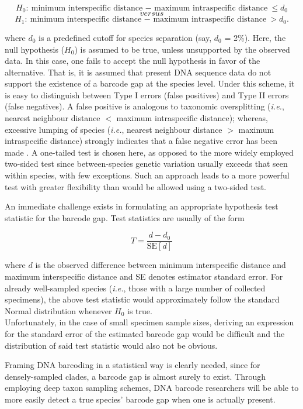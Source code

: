 $$H_0: \textrm{minimum interspecific distance $-$ maximum intraspecific distance} \leq d_0$$ $$\textit{versus}$$ $$H_1: \textrm{minimum interspecific distance $-$ maximum intraspecific distance} > d_0.$$

\noindent where $d_0$ is a predefined cutoff for species separation (say, $d_0$ = 2\%). Here, the null hypothesis ($H_0$) is assumed to be true, unless unsupported by the observed data. In this case, one fails to accept the null hypothesis in favor of the alternative. That is, it is assumed that present DNA sequence data do not support the existence of a barcode gap at the species level. Under this scheme, it is easy to distinguish between Type I errors (false positives) and Type II errors (false negatives). A false positive is analogous to taxonomic oversplitting (\textit{i.e.}, nearest neighbour distance $<$ maximum intraspecific distance); whereas, excessive lumping of species (\textit{i.e.}, nearest neighbour distance $>$ maximum intraspecific distance) strongly indicates that a false negative error has been made \cite{hubert2015dna, meyer2005dna}. A one-tailed test is chosen here, as opposed to the more widely employed two-sided test since between-species genetic variation usually exceeds that seen within species, with few exceptions. Such an approach leads to a more powerful test with greater flexibility than would be allowed using a two-sided test. 



An immediate challenge exists in formulating an appropriate hypothesis test statistic for the barcode gap. Test statistics are usually of the form

$$ T = \frac{d - d_0}{\textrm{SE}[d]} $$

\noindent where $d$ is the observed difference between minimum interspecific distance and maximum interspecific distance and SE denotes estimator standard error. For already well-sampled species (\textit{i.e.}, those with a large number of collected specimens), the above test statistic would approximately follow the standard Normal distribution whenever $H_0$ is true. \\ Unfortunately, in the case of small specimen sample sizes, deriving an expression for the standard error of the estimated barcode gap would be difficult and the distribution of said test statistic would also not be obvious.

 

Framing DNA barcoding in a statistical way is clearly needed, since for \\ densely-sampled clades, a barcode gap is almost surely to exist. Through employing deep taxon sampling schemes, DNA barcode researchers will be able to more easily detect a true species' barcode gap when one is actually present.  


